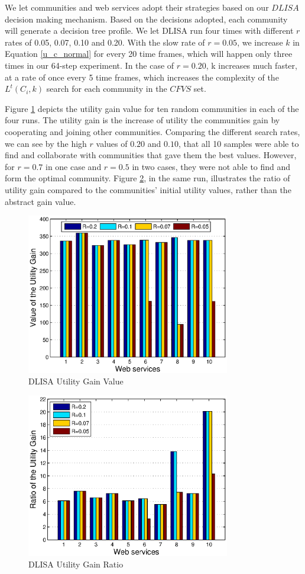 \documentclass[10pt,journal,cspaper,compsoc]{IEEEtran}
\begin{document}
We let communities and web services adopt their strategies based on our $DLISA$ decision making mechanism. Based on the decisions adopted, each community will generate a decision tree profile. We let DLISA run four times with different $r$ rates of 0.05, 0.07, 0.10 and 0.20. With the slow rate of $r = 0.05$, we increase $k$ in Equation \ref{u_c_normal} for every 20 time frames, which will happen only three times in our 64-step experiment. In the case of $r = 0.20$, k increases much faster, at a rate of once every 5 time frames, which increases the complexity of the $L^t(C_i,k)$ search for each community in the $CFVS$ set. 

Figure \ref{utility_gain_value} depicts the utility gain value for ten random communities in each of the four runs. The utility gain is the increase of utility the communities gain by cooperating and joining other communities. Comparing the different search rates, we can see by the high $r$ values of $0.20$ and $0.10$, that all 10 samples were able to find and collaborate with communities that gave them the best values. However, for $r=0.7$ in one case and $r=0.5$ in two cases, they were not able to find and form the optimal community. Figure \ref{utility_gain_ratio}, in the same run, illustrates the ratio of utility gain compared to the communities' initial utility values, rather than the abstract gain value.

\begin{figure}%
\centering
\includegraphics[width=3.5in]{figures/utility_gain_r.eps}
\caption{DLISA Utility Gain Value}
\label{utility_gain_value}
\end{figure}

\begin{figure}%
\centering
\includegraphics[width=3.5in]{figures/utility_ratio_r.eps}
\caption{DLISA Utility Gain Ratio}
\label{utility_gain_ratio}
\end{figure}
\end{document}
